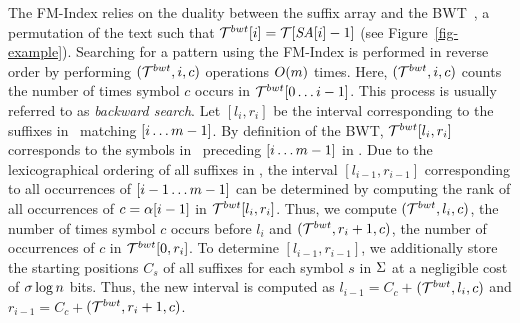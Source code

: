 The FM-Index relies on the duality between the suffix array and the BWT~\cite{bw-dec94}, 
a permutation of the text such that $\mathcal{T}^{bwt}[i] = \mathcal{T}[\mbox{\emph{SA}}[i]-1]$ (see Figure~\ref{fig-example}). Searching for
a pattern using the FM-Index is performed in reverse order by performing  
{\rankop$(\mathcal{T}^{bwt},i,c)$} operations $O(m)$ times. Here, {\rankop$(\mathcal{T}^{bwt},i,c)$}  
counts the number of times symbol $c$ occurs in $\mathcal{T}^{bwt}[0\ldots i-1]$. 
This process is usually referred to as {\it backward search}. Let \SA$[l_i,r_i]$ be
the interval corresponding to the suffixes in \col\ matching \pattern$[i\ldots m-1]$.
By definition of the BWT, $\mathcal{T}^{bwt}[l_i,r_i]$ corresponds to the symbols in \col\
preceding \pattern$[i\ldots m-1]$ in \col. Due to the lexicographical ordering
of all suffixes in \SA, the interval \SA$[l_{i-1},r_{i-1}]$ corresponding to all
occurrences of \pattern$[i-1\ldots m-1]$ can be determined by computing the rank
of all occurrences of $c=\alpha[i-1]$ in $\mathcal{T}^{bwt}[l_i,r_i]$. Thus, we compute
\rankop$(\mathcal{T}^{bwt},l_i,c)$, the number of times symbol $c$ occurs before
$l_i$ and \rankop$(\mathcal{T}^{bwt},r_i+1,c)$, the number of occurrences of $c$ in $\mathcal{T}^{bwt}[0,r_i]$.
To determine \SA$[l_{i-1},r_{i-1}]$, we additionally store the starting positions $C_{s}$
of all suffixes for each symbol $s$ in $\Sigma$ at a negligible cost 
of $\sigma \log n$ bits.
Thus, the new interval is computed as $l_{i-1} = C_c + $\rankop$(\mathcal{T}^{bwt},l_i,c)$ 
and $r_{i-1} = C_c + $\rankop$(\mathcal{T}^{bwt},r_i+1,c)$.



